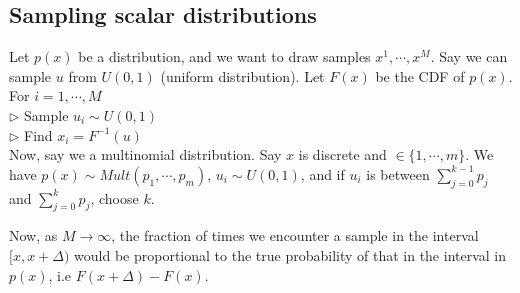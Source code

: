 \subsection{Sampling scalar distributions}
Let $p(x)$ be a distribution, and we want to draw samples $x^1, \cdots, x^M$. Say we can sample $u$ from $U(0,1)$ (uniform distribution). Let $F(x)$ be the CDF of $p(x)$. \\
\noindent For $i=1, \cdots, M$ \\
$\triangleright$ Sample $u_i \sim U(0,1)$ \\
$\triangleright$ Find $x_i = F^{-1}(u)$ \\
\noindent Now, say we a multinomial distribution. Say $x$ is discrete and $\in \{1, \cdots, m\}$. We have $p(x) \sim Mult(p_1, \cdots, p_m)$, $u_i \sim U(0,1)$, and if $u_i$ is between $\sum_{j=0}^{k-1} p_j$ and $\sum_{j=0}^{k} p_j$, choose $k$. 

Now, as $M \to \infty$, the fraction of times we encounter a sample in the interval $[x, x+\Delta)$ would be proportional to the true probability of that in the interval in $p(x)$, i.e $F(x+\Delta) - F(x)$.
